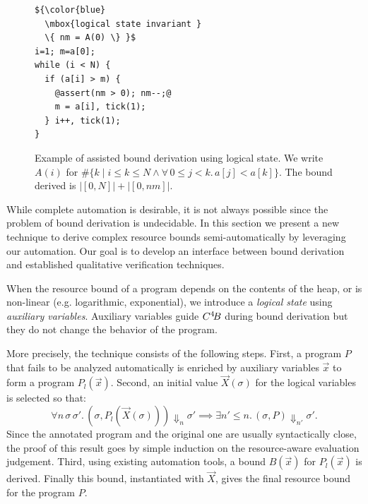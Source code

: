 \documentclass[nocopyrightspace,preprint,pldi]{sigplanconf-pldi15}
\begin{document}
\ifdefined\fullversion
\begin{figure}
\begin{lstlisting}
${\color{blue}
  \mbox{logical state invariant }
  \{ nm = A(0) \} }$
i=1; m=a[0];
while (i < N) {
  if (a[i] > m) {
    @assert(nm > 0); nm--;@
    m = a[i], tick(1);
  } i++, tick(1);
}
\end{lstlisting}
\caption{Example of assisted bound derivation using logical state.
  We write $A(i)$ for
  $\#\{ k \mid i \le k \le N \land \forall\, 0\le j<k.\, a[j] < a[k]\}$.
  The bound derived is $|[0,N]| + |[0,nm]|$.
  }
\end{figure}
\fi

While complete automation is desirable, it is not always possible
since the problem of bound derivation is undecidable.  In this section
we present a new technique to derive complex resource bounds
semi-automatically by leveraging our automation. Our goal is to
develop an interface between bound derivation and
established qualitative verification techniques.

When the resource bound of a program depends on the contents of the
heap, or is non-linear (e.g. logarithmic, exponential), we
introduce a \emph{logical state} using \emph{auxiliary variables}.
Auxiliary variables guide $C^4\!B$ during bound derivation
but they do not change the behavior of the program.

More precisely, the technique consists of the following steps. First,
a program $P$ that fails to be analyzed automatically is enriched by
auxiliary variables $\vec x$ to form a program
$P_l(\vec x)$.  Second, an initial value $\vec X(\sigma)$ for the
logical variables is selected so that:
$$
\forall n\, \sigma\, \sigma'.\,
  (\sigma, P_l(\vec X(\sigma))) \Downarrow_n \sigma'
    {\implies}
  \exists n' {\le} n.\,
    (\sigma, P) \Downarrow_{n'} \sigma'.
$$
Since the annotated program and the original one are usually
syntactically close, the proof of this result goes
by simple induction on the resource-aware evaluation judgement.
Third, using existing automation tools, a bound $B(\vec x)$ for
$P_l(\vec x)$ is derived.  Finally this bound, instantiated with
$\vec X$, gives the final resource bound for the program $P$.
\end{document}
